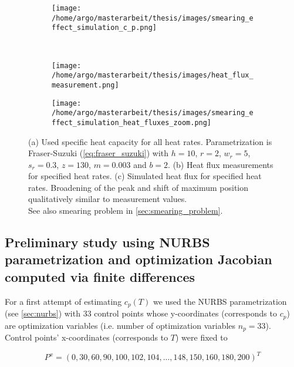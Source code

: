 \documentclass{scrartcl}[12pt, halfparskip]
\numberwithin{equation}{section}
\numberwithin{figure}{section}
\numberwithin{table}{section}
\begin{document}
\begin{figure}[H]
	\centering
	\begin{subfigure}{0.9\textwidth}
		\centering
		\texttt{[image: /home/argo/masterarbeit/thesis/images/smearing\_effect\_simulation\_c\_p.png]}
		\caption{}
		\label{fig:smearing_effect_c_p}
	\end{subfigure} \\
	\begin{subfigure}{0.49\textwidth}
		\texttt{[image: /home/argo/masterarbeit/thesis/images/heat\_flux\_measurement.png]}
		\caption{}
		\label{fig:smearing_effect_measurement_heat_flux}
	\end{subfigure}
	\begin{subfigure}{0.49\textwidth}
		\texttt{[image: /home/argo/masterarbeit/thesis/images/smearing\_effect\_simulation\_heat\_fluxes\_zoom.png]}
		\caption{}
		\label{fig:smearing_effect_simulation_heat_flux}
	\end{subfigure}
	\caption{(a) Used specific heat capacity for all heat rates. Parametrization is Fraser-Suzuki (\cref{eq:fraser_suzuki}) with $h=10$, $r=2$, $w_r=5$, $s_r=0.3$, $z=130$, $m=0.003$ and $b=2$. (b) Heat flux measurements for specified heat rates. (c) Simulated heat flux for specified heat rates. Broadening of the peak and shift of maximum position qualitatively similar to measurement values. \\
	See also smearing problem in \cref{sec:smearing_problem}.}
\end{figure}



\subsection{Preliminary study using NURBS parametrization and optimization Jacobian computed via finite differences}
\label{sec:param_estim_NURBS}

For a first attempt of estimating $c_p(T)$  we used the NURBS parametrization (see \cref{sec:nurbs}) with 33 control points whose y-coordinates (corresponds to $c_p$) are optimization variables (i.e. number of optimization variables $n_p=33$). Control points' x-coordinates (corresponds to $T$) were fixed to 

\begin{equation}
	P^x = (0, 30, 60, 90, 100, 102, 104, ..., 148, 150, 160, 180, 200)^T
\end{equation}
\end{document}
